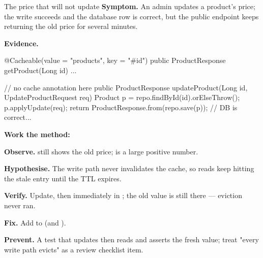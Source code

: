 \begin{debuglab}{The price that will not update}
\textbf{Symptom.} An admin updates a product's price; the write succeeds and the database row is correct, but the public endpoint keeps returning the old price for several minutes.

\smallskip\textbf{Evidence.}
\begin{javabox}
@Cacheable(value = "products", key = "#id")
public ProductResponse getProduct(Long id) { ... }

// no cache annotation here
public ProductResponse updateProduct(Long id, UpdateProductRequest req) {
  Product p = repo.findById(id).orElseThrow();
  p.applyUpdate(req);
  return ProductResponse.from(repo.save(p));   // DB is correct...
}
\end{javabox}

\textbf{Work the method:}
\begin{tickcheck}
  \item \textbf{Observe.}  still shows the old price;  is a large positive number.
  \item \textbf{Hypothesise.} The write path never invalidates the cache, so reads keep hitting the stale entry until the TTL expires.
  \item \textbf{Verify.} Update, then immediately  in ; the old value is still there --- eviction never ran.
  \item \textbf{Fix.} Add  to  (and ).
  \item \textbf{Prevent.} A test that updates then reads and asserts the fresh value; treat "every write path evicts" as a review checklist item.
\end{tickcheck}
\end{debuglab}


